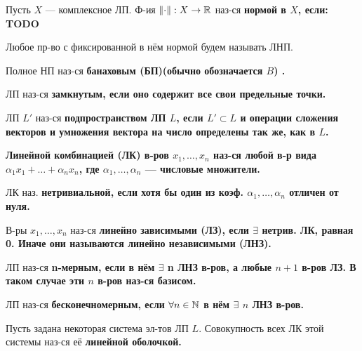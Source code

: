 \begin{defn}
Пусть $X$ --- комплексное ЛП. Ф-ия $\left\lVert\cdot\right\rVert: X \rightarrow \mathbb{R}$ наз-ся \bf{нормой} в $X$, если:
TODO

Любое пр-во с фиксированной в нём нормой будем называть ЛНП.
\end{defn}

\begin{defn}
Полное НП наз-ся \bf{банаховым (БП)}(обычно обозначается $B$) .
\end{defn}

\begin{defn}
ЛП наз-ся \bf{замкнутым}, если оно содержит все свои предельные точки.
\end{defn}

\begin{defn}
ЛП $L'$ наз-ся \bf{подпространством} ЛП $L$, если $L' \subset L$ и операции сложения векторов и умножения вектора на число определены так же, как в $L$.
\end{defn}

\begin{defn}
\bf{Линейной комбинацией (ЛК)} в-ров $x_1, \dots, x_n$ наз-ся любой в-р вида $\alpha_1 x_1 + \dots + \alpha_n x_n$, где $\alpha_1, \dots, \alpha_n$ --- числовые множители.
\end{defn}

\begin{defn}
ЛК наз. \bf{нетривиальной}, если хотя бы один из коэф. $\alpha_1, \dots, \alpha_n$ отличен от нуля.
\end{defn}

\begin{defn}
В-ры $x_1, \dots, x_n$ наз-ся \bf{линейно зависимыми (ЛЗ)}, если $\exists$ нетрив. ЛК, равная 0. Иначе они называются \bf{линейно независимыми (ЛНЗ)}.
\end{defn}

\begin{defn}
ЛП наз-ся \bf{n-мерным}, если в нём $\exists$ n ЛНЗ в-ров, а любые $n+1$ в-ров ЛЗ. В таком случае эти $n$ в-ров наз-ся базисом.
\end{defn}

\begin{defn}
ЛП наз-ся \bf{бесконечномерным}, если $\forall n \in \mathbb{N}$ в нём $\exists$ $n$ ЛНЗ в-ров.
\end{defn}

\begin{defn}
Пусть задана некоторая система эл-тов ЛП $L$. Совокупность всех ЛК этой системы наз-ся её \bf{линейной оболочкой}.
\end{defn}

